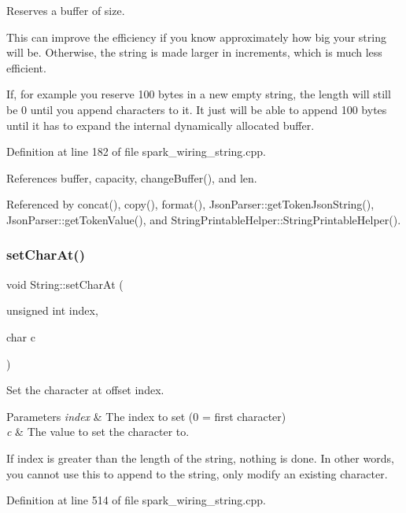 Reserves a buffer of size. 

This can improve the efficiency if you know approximately how big your string will be. Otherwise, the string is made larger in increments, which is much less efficient.

If, for example you reserve 100 bytes in a new empty string, the length will still be 0 until you append characters to it. It just will be able to append 100 bytes until it has to expand the internal dynamically allocated buffer. 

Definition at line 182 of file spark\+\_\+wiring\+\_\+string.\+cpp.



References buffer, capacity, change\+Buffer(), and len.



Referenced by concat(), copy(), format(), Json\+Parser\+::get\+Token\+Json\+String(), Json\+Parser\+::get\+Token\+Value(), and String\+Printable\+Helper\+::\+String\+Printable\+Helper().

\mbox{\label{class_string_a000b7c7b89bbd326a9b966a79bc838e8}} 
\subsubsection{\texorpdfstring{set\+Char\+At()}{setCharAt()}}
{\footnotesize\ttfamily void String\+::set\+Char\+At (\begin{DoxyParamCaption}\item[{unsigned int}]{index,  }\item[{char}]{c }\end{DoxyParamCaption})}



Set the character at offset index. 


\begin{DoxyParams}{Parameters}
{\em index} & The index to set (0 = first character)\\
\hline
{\em c} & The value to set the character to.\\
\hline
\end{DoxyParams}
If index is greater than the length of the string, nothing is done. In other words, you cannot use this to append to the string, only modify an existing character. 

Definition at line 514 of file spark\+\_\+wiring\+\_\+string.\+cpp.



